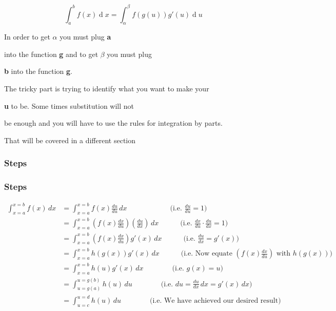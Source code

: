 \[
\int _{a}^{b} f(x)\operatorname {d}x = \int _{\alpha}^{\beta} f(g(u))g\prime (u)\operatorname {d}u
\]


In order to get $\alpha$ you must plug \textbf{a}

into the function \textbf{g} and to get $\beta$ you must plug

\textbf{b} into the function \textbf{g}.


The tricky part is trying to identify what you want to make your

\textbf{u} to be. Some times substitution will not

be enough and you will have to use the rules for integration by parts.

That will be covered in a different section


\subsubsection{Steps}
\label{sss:step-fca3}


\subsubsection{Steps}
\label{sss:step-fca3}


\begin{align}
\int _{x=a}^{x=b}f(x) \, dx
&= \int _{x=a}^{x=b} f(x) \frac{du}{du} \, dx \quad\quad\quad\quad\quad\quad \text{(i.e. } \frac{du}{du}=1\text{)} \\&= \int _{x=a}^{x=b} \left(f(x) \frac{dx}{du}\right) \left(\frac{du}{dx}\right) \, dx \quad\quad\quad \text{(i.e. } \frac{dx}{du} \cdot \frac{du}{dx}=1\text{)} \\&= \int _{x=a}^{x=b} \left(f(x) \frac{dx}{du}\right) g'(x) \, dx \quad\quad\quad \text{(i.e. } \frac{du}{dx}=g'(x)\text{)} \\&= \int _{x=a}^{x=b} h(g(x)) g'(x) \, dx \quad\quad\quad \text{(i.e. Now equate } \left(f(x) \frac{dx}{du}\right) \text{ with } h(g(x))\text{)} \\&= \int _{x=a}^{x=b} h(u) g'(x) \, dx \quad\quad\quad\quad \text{(i.e. } g(x)=u\text{)} \\&= \int _{u=g(a)}^{u=g(b)} h(u) \, du \quad\quad\quad\quad \text{(i.e. } du=\frac{du}{dx} \, dx=g'(x) \, dx\text{)} \\&= \int _{u=c}^{u=d} h(u) \, du \quad\quad\quad\quad \text{(i.e. We have achieved our desired result)}
\end{align}


